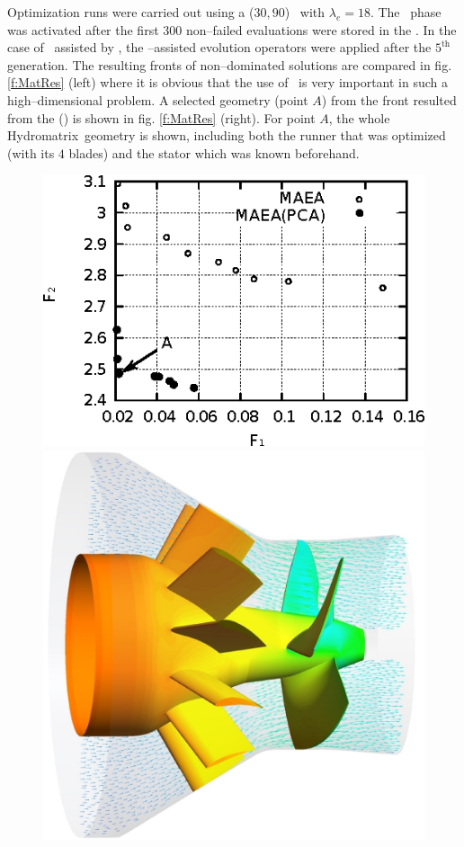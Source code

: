 \documentclass{vki_ls}
\begin{document}
Optimization runs were carried out using a ($30, 90$) \MAEA\ with $\lambda_e\!=\!18$. 
The \IPE\ phase was activated after the first $300$ non--failed evaluations were stored in the \DB. In the case of \MAEA\ assisted by \PCA, the \PCA--assisted evolution operators were applied after the $5^{\mbox{th}}$ generation. 
The resulting fronts of non--dominated solutions are compared in fig. \ref{f:MatRes} (left) where it is obvious that the use of \PCA\ is very important in such a high--dimensional problem. A selected geometry (point $A$) from the front resulted from the \MAEA(\PCA) is shown in fig. \ref{f:MatRes} (right). For point $A$, the whole Hydromatrix\textregistered~geometry is shown, including both the runner that was optimized (with its $4$ blades) and the stator which was known beforehand.

%
\begin{figure}[!ht]
    \begin{minipage}{0.49\linewidth}
        \includegraphics[scale=1.3]{maeas/MatrixPareto.eps}
        \vspace{0.3cm}
    \end{minipage}
    \begin{minipage}{0.49\linewidth}
        \includegraphics[scale=0.3]{maeas/MatrixFlow.eps}

\end{minipage}
\end{figure}
\end{document}
